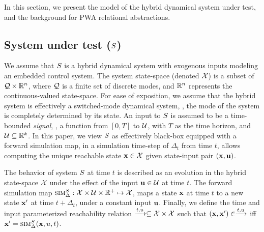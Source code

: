 In this section, we present the model of the hybrid dynamical system
under test, and the background for PWA relational abstractions.


\subsection{System under test ($S$)}

We assume that $S$ is a hybrid dynamical system with exogenous
inputs modeling an embedded control system. The system state-space
(denoted $\mathcal{X}$) is a subset of $\mathcal{Q} \times \mathbb{R}^n$,
where $\mathcal{Q}$ is a finite set of discrete modes, and $\mathbb{R}^n$
represents the continuous-valued state-space. For ease of exposition,
we assume that the hybrid system is effectively a switched-mode
dynamical system, \ie, the mode of the system is completely determined
by its state.  An input to $S$ is assumed to be a time-bounded
{\em signal}, \ie, a function from $[0,T]$ to $\mathcal{U}$, with $T$ as
the time horizon, and $\mathcal{U} \subseteq \mathbb{R}^k$.  In this paper, we
view $S$ as effectively black-box equipped with a forward
simulation map, in a simulation time-step of $\Delta_t$ from time $t$,
allows computing the unique reachable state $\mathbf{x} \in \mathcal{X}$
given state-input pair $(\mathbf{x},\mathbf{u})$.





\begin{definition}
    The behavior of system $S$ at time $t$ is described as an
    evolution in the hybrid state-space $\mathcal{X}$ under the
    effect of the input $\mathbf{u} \in \mathcal{U}$ at time $t$. The forward
    simulation map $\mbox{\sc sim}_\Delta^{S} : \mathcal{X} \times \mathcal{U}
    \times \mathbb{R}^+ \mapsto \mathcal{X}$, maps a state $\mathbf{x}$ at time
    $t$ to a new state $\mathbf{x}'$ at time $t+\Delta_t$, under a constant
    input $\mathbf{u}$.  Finally, we define the time and input parameterized
    reachability relation $\xrightarrow{t,u} \subseteq \mathcal{X} \times
    \mathcal{X}$ such that $(\mathbf{x},\mathbf{x}') \in \xrightarrow{t,u}$ iff
    $\mathbf{x}'=\mbox{\sc sim}_\Delta^{S}(\mathbf{x},u,t)$.
\end{definition}

